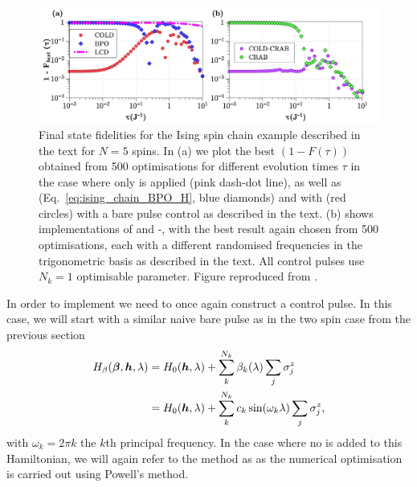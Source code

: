 \begin{figure}[t]
    \centering
    \includegraphics[width=\linewidth]{images_v1/IsingUnconstrained.jpg} \caption[Applying COLD and COLD-CRAB to the Ising chain for 5 spins without constraints on the driving amplitudes.]{Final state fidelities for the Ising spin chain example described in the text for $N=5$ spins. In (a) we plot the best $(1 - F(\tau))$ obtained from 500 optimisations for different evolution times $\tau$ in the case where only   is applied (pink dash-dot line), as well as  (Eq.~\eqref{eq:ising_chain_BPO_H}, blue diamonds) and  with   (red circles) with a bare pulse control as described in the text. (b) shows implementations of  and -, with the best result again chosen from 500 optimisations, each with a different randomised frequencies in the trigonometric basis as described in the text. All control pulses use $N_k = 1$ optimisable parameter. Figure reproduced from \cite{cepaite_cold_2023}.} \label{fig:ising_unconstrained}
\end{figure}

In order to implement  we need to once again construct a control pulse. In this case, we will start with a similar naive bare pulse as in the two spin case from the previous section
\begin{equation}\label{eq:ising_chain_BPO_H}
    \begin{aligned}
        H_{\beta}(\boldsymbol{\beta}, \boldsymbol{h}, \lambda) &= H_0(\boldsymbol{h}, \lambda) + \sum_k^{N_k} \beta_k(\lambda) \sum_j \sigma^z_j \\
        &= H_0(\boldsymbol{h}, \lambda) + \sum_k^{N_k} c_k \sin(\omega_k \lambda) \sum_j \sigma^z_j,
    \end{aligned}
\end{equation}
with $\omega_k = 2\pi k$ the $k$th principal frequency. In the case where no  is added to this Hamiltonian, we will again refer to the method as  as the numerical optimisation is carried out using Powell's method.

